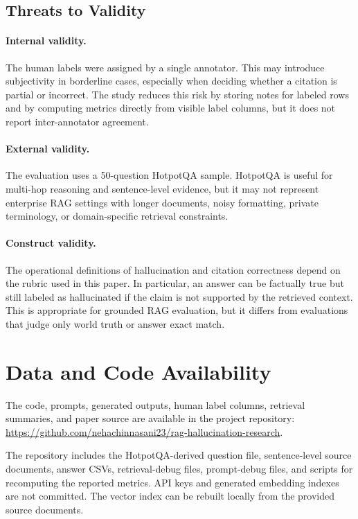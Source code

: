 \documentclass[10pt,twocolumn]{article}
\begin{document}
\subsection{Threats to Validity}

\paragraph{Internal validity.}
The human labels were assigned by a single annotator. This may introduce subjectivity in borderline cases, especially when deciding whether a citation is partial or incorrect. The study reduces this risk by storing notes for labeled rows and by computing metrics directly from visible label columns, but it does not report inter-annotator agreement.

\paragraph{External validity.}
The evaluation uses a 50-question HotpotQA sample. HotpotQA is useful for multi-hop reasoning and sentence-level evidence, but it may not represent enterprise RAG settings with longer documents, noisy formatting, private terminology, or domain-specific retrieval constraints.

\paragraph{Construct validity.}
The operational definitions of hallucination and citation correctness depend on the rubric used in this paper. In particular, an answer can be factually true but still labeled as hallucinated if the claim is not supported by the retrieved context. This is appropriate for grounded RAG evaluation, but it differs from evaluations that judge only world truth or answer exact match.

\section{Data and Code Availability}

The code, prompts, generated outputs, human label columns, retrieval summaries, and paper source are available in the project repository:
\url{https://github.com/nehachinnasani23/rag-hallucination-research}.

The repository includes the HotpotQA-derived question file, sentence-level source documents, answer CSVs, retrieval-debug files, prompt-debug files, and scripts for recomputing the reported metrics. API keys and generated embedding indexes are not committed. The vector index can be rebuilt locally from the provided source documents.
\end{document}
